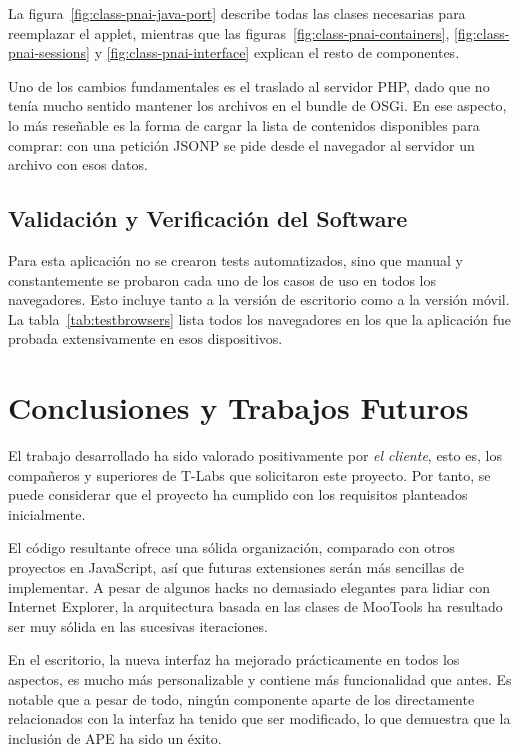 La figura~\ref{fig:class-pnai-java-port} describe todas las clases necesarias para reemplazar el applet, mientras que las figuras~\ref{fig:class-pnai-containers}, \ref{fig:class-pnai-sessions} y \ref{fig:class-pnai-interface} explican el resto de componentes.

Uno de los cambios fundamentales es el traslado al servidor PHP, dado que no tenía mucho sentido mantener los archivos en el bundle de OSGi.
En ese aspecto, lo más reseñable es la forma de cargar la lista de contenidos disponibles para comprar: con una petición JSONP se pide desde el navegador al servidor un archivo con esos datos.


\subsection{Validación y Verificación del Software} %
\label{sub:validacion_y_verificacion_del_software}

Para esta aplicación no se crearon tests automatizados, sino que manual y constantemente se probaron cada uno de los casos de uso en todos los navegadores.
Esto incluye tanto a la versión de escritorio como a la versión móvil.
La tabla~\ref{tab:testbrowsers} lista todos los navegadores en los que la aplicación fue probada extensivamente en esos dispositivos.
\nicesectionending

\section{Conclusiones y Trabajos Futuros} %
\label{sec:conclusiones_y_trabajos_futuros}

El trabajo desarrollado ha sido valorado positivamente por \emph{el cliente}, esto es, los compañeros y superiores de T-Labs que solicitaron este proyecto.
Por tanto, se puede considerar que el proyecto ha cumplido con los requisitos planteados inicialmente.

El código resultante ofrece una sólida organización, comparado con otros proyectos en JavaScript, así que futuras extensiones serán más sencillas de implementar.
A pesar de algunos hacks no demasiado elegantes para lidiar con Internet Explorer, la arquitectura basada en las clases de MooTools ha resultado ser muy sólida en las sucesivas iteraciones.

En el escritorio, la nueva interfaz ha mejorado prácticamente en todos los aspectos, es mucho más personalizable y contiene más funcionalidad que antes.
Es notable que a pesar de todo, ningún componente aparte de los directamente relacionados con la interfaz ha tenido que ser modificado, lo que demuestra que la inclusión de APE ha sido un éxito.

